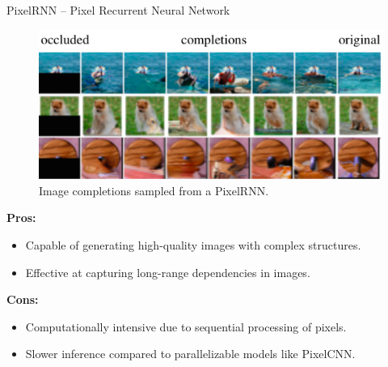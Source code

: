 \begin{frame}[allowframebreaks]{PixelRNN – Pixel Recurrent Neural Network}
    \begin{figure}
        \centering
        \includegraphics[width=\textwidth,keepaspectratio]{images/autoregressive/example-pixel-rnn.png}
        \caption*{Image completions sampled from a PixelRNN.}
    \end{figure}

    \framebreak
    \textbf{Pros:}
    \begin{itemize}
        \item Capable of generating high-quality images with complex structures.
        \item Effective at capturing long-range dependencies in images.
    \end{itemize}

    \textbf{Cons:}
    \begin{itemize}
        \item Computationally intensive due to sequential processing of pixels.
        \item Slower inference compared to parallelizable models like PixelCNN.
    \end{itemize}
\end{frame}